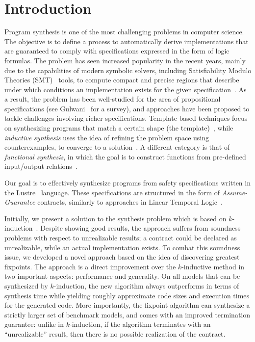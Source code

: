 
\section{Introduction}

Program synthesis is one of the most challenging problems in computer science. The objective is to define a process to automatically derive implementations that are guaranteed to comply with specifications expressed in the form of logic formulas. The problem has seen increased popularity in the recent years, mainly due to the capabilities of modern symbolic solvers, including Satisfiability Modulo Theories (SMT)~\cite{BarFT-SMTLIB} tools, to compute compact and precise regions that describe under which conditions an implementation exists for the given specification~\cite{reynolds2015counterexample}.
As a result, the problem has been well-studied for the area of propositional specifications (see Gulwani~\cite{gulwani2010dimensions} for a survey), and approaches have been proposed to tackle challenges involving richer specifications. Template-based techniques focus on synthesizing programs that match a certain shape (the template)~\cite{srivastava2013template}, while {\em inductive synthesis} uses the idea of refining the problem space using counterexamples, to converge to a solution~\cite{flener2001inductive}. A different category is that of \textit{functional synthesis}, in which the goal is to construct functions from pre-defined input/output relations~\cite{kuncak2013functional}.

Our goal is to effectively synthesize programs from safety specifications written in the Lustre~\cite{lustrev6} language.  These specifications are structured in the form of {\em Assume-Guarantee} contracts, similarly to approaches in Linear Temporal Logic~\cite{ringert2017synthesis}.

Initially, we present a solution to the synthesis problem which is based on $k$-induction~\cite{gacek2015towards,katis2016towards}. Despite showing good results, the approach suffers from soundness problems with respect to unrealizable results; a contract could be declared as unrealizable, while an actual implementation exists. To combat this soundness issue, we developed a novel approach based on the idea of discovering greatest fixpoints. The approach is a direct improvement over the $k$-inductive method in two important aspects: performance and generality.  On all models that can be synthesized by $k$-induction, the new algorithm always outperforms in terms of synthesis time while yielding roughly approximate code sizes and execution times for the generated code. More importantly, the fixpoint algorithm can synthesize a strictly larger set of benchmark models, and comes with an improved termination guarantee: unlike in $k$-induction, if the algorithm terminates with an ``unrealizable'' result, then there is no possible realization of the contract.

